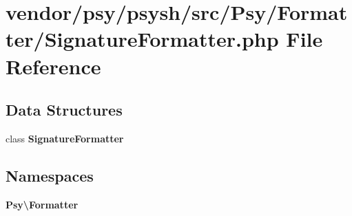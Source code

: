 \section{vendor/psy/psysh/src/\+Psy/\+Formatter/\+Signature\+Formatter.php File Reference}
\label{_signature_formatter_8php}
\subsection*{Data Structures}
\begin{DoxyCompactItemize}
\item 
class {\bf Signature\+Formatter}
\end{DoxyCompactItemize}
\subsection*{Namespaces}
\begin{DoxyCompactItemize}
\item 
 {\bf Psy\textbackslash{}\+Formatter}
\end{DoxyCompactItemize}
